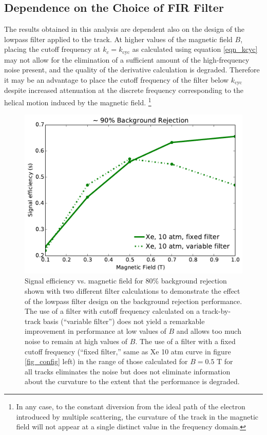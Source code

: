\documentclass{JINST}
\begin{document}
\subsection{Dependence on the Choice of FIR Filter}\label{ssec:FIRdep}
The results obtained in this analysis are dependent also on the design of the lowpass filter applied to the track.  At higher values of the magnetic field $B$, placing the cutoff frequency at $k_{c} = k_{\mathrm{cyc}}$ as calculated using equation
\ref{eqn_kcyc} may not allow for the elimination of a sufficient amount of the high-frequency noise present, and the
quality of the derivative calculation is degraded.  Therefore it may be an advantage to place the cutoff frequency of the filter
below $k_{\mathrm{cyc}}$ despite increased attenuation at the discrete frequency corresponding to the helical motion 
induced by the magnetic field.  \footnote{In any case, to the constant diversion from the ideal path of the electron
introduced by multiple scattering, the curvature of the track in the magnetic field will not appear at a single distinct value in 
the frequency domain.}  

\begin{figure}[!htb]
	\centering
	\includegraphics[scale=0.43]{fig/eff_vs_b_cf_filter_90.pdf}
	\caption{\label{fig_FIRdependence}Signal efficiency vs. magnetic field for 80\% background rejection shown with two different filter calculations to demonstrate the effect of the lowpass filter design on the background rejection performance.  The use of a filter with cutoff frequency calculated on a track-by-track basis (``variable filter'') does not yield a remarkable improvement in performance at low values of $B$ and allows too much noise to remain at high values of $B$.  The use of a filter with a fixed cutoff frequency (``fixed filter,'' same as Xe 10 atm curve in figure \protect\ref{fig_config} left) in the range of those calculated for $B = 0.5$ T for all tracks eliminates the noise but does not eliminate information about the curvature to the extent that the performance is degraded.}
\end{figure}
\end{document}
